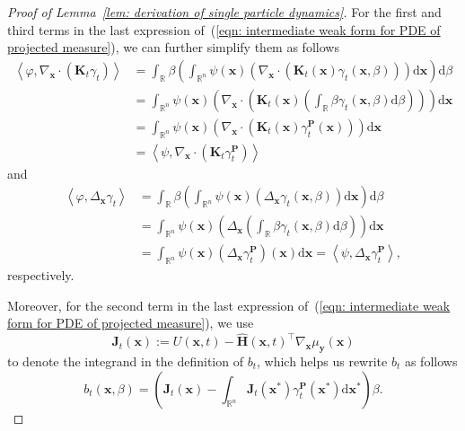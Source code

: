 \documentclass[10pt,a4paper]{amsart}
\newcommand{\dif}{{\mathrm{d}}}
\def\eqref#1{(\ref{#1})}
\def\mH{{\bm{H}}}
\def\mJ{{\bm{J}}}
\def\mK{{\bm{K}}}
\def\mP{{\bm{P}}}
\def\vx{{\bm{x}}}
\def\vy{{\bm{y}}}
\begin{document}
\begin{proof}[Proof of Lemma~\ref{lem: derivation of single particle dynamics}]
    For the first and third terms in the last expression of~\eqref{eqn: intermediate weak form for PDE of projected measure}, we can further simplify them as follows
    \begin{equation}
    \label{eqn: derivation of first term}
    \begin{aligned}
    \left\langle \varphi, \nabla_{\vx} \cdot \left(\mK_{t}\gamma_t\right) \right\rangle &= \int_{\mathbb{R}}\beta\left(\int_{\mathbb{R}^n}\psi(\vx)\left(\nabla_{\vx} \cdot\left(\mK_t(\vx) \gamma_t(\vx,\beta)\right)\right)\dif\vx\right)\dif\beta\\
    &= \int_{\mathbb{R}^n}\psi(\vx)\left(\nabla_{\vx} \cdot\left(\mK_t(\vx) \left(\int_{\mathbb{R}}\beta\gamma_t(\vx,\beta)\dif\beta\right)\right)\right)\dif\vx\\
    &= \int_{\mathbb{R}^n}\psi(\vx)\left(\nabla_{\vx} \cdot\left(\mK_t(\vx)\gamma^{\mP}_t(\vx)\right)\right)\dif\vx \\
    &=\left\langle\psi,\nabla_{\vx}\cdot(\mK_{t}\gamma^{\mP}_t)\right\rangle
    \end{aligned}    
    \end{equation}
    and 
    \begin{equation}
        \label{eqn: derivation of third term}
        \begin{aligned}
            \left\langle \varphi, \Delta_{\vx}\gamma_t \right\rangle &= \int_{\mathbb{R}}\beta\left(\int_{\mathbb{R}^n}\psi(\vx)\left(\Delta_{\vx}\gamma_t(\vx,\beta)\right)\dif\vx\right)\dif\beta\\
            &= \int_{\mathbb{R}^n}\psi(\vx)\left(\Delta_{\vx}\left(\int_{\mathbb{R}}\beta\gamma_t(\vx,\beta)\dif\beta\right)\right)\dif\vx\\
            &= \int_{\mathbb{R}^n}\psi(\vx)\left(\Delta_{\vx}\gamma^{\mP}_t\right)(\vx)\dif\vx = \left\langle\psi,\Delta_{\vx}\gamma^{\mP}_t\right\rangle,
        \end{aligned}
    \end{equation}
    respectively.

    Moreover, for the second term in the last expression of~\eqref{eqn: intermediate weak form for PDE of projected measure}, we use 
    \begin{equation}
    \label{eqn: defn of J_t}
    \mJ_t(\vx) := U(\vx,t) - \widehat{\mH}(\vx,t)^\intercal\nabla_{\vx}\mu_{\vy}(\vx)
    \end{equation} 
    to denote the integrand in the definition of $b_t$, which helps us rewrite $b_t$ as follows
    $$b_t(\vx,\beta) = \left(\mJ_t(\vx)-\int_{\mathbb{R}^n}\mJ_t(\vx^\ast)\gamma^{\mP}_t(\vx^\ast)\dif\vx^\ast\right)\beta.$$


\end{proof}
\end{document}

